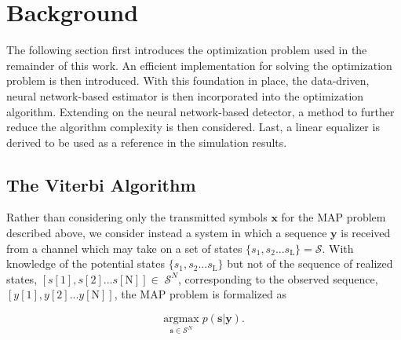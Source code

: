  


 
\section{Background}
The following section first introduces the optimization problem used in the remainder of this work. An efficient implementation for solving the optimization problem is then introduced. With this foundation in place, the data-driven, neural network-based estimator is then incorporated into the optimization algorithm. 
Extending on the neural network-based detector, a method to further reduce the algorithm complexity is then considered. Last, a linear equalizer is derived to be used as a reference in the simulation results. 
\subsection{The Viterbi Algorithm}
Rather than considering only the transmitted symbols $\mathbf{x}$ for the MAP problem described above, we consider instead a system in which a sequence $\mathbf{y}$ is received from a channel which may take on a set of states $\{s_1, s_2... s_{\text{L}}\} = \mathcal{S}$. With knowledge of the potential states $\{s_1, s_2... s_{\text{L}}\}$ but not of the sequence of realized states, $[s[1], s[2]... s[\text{N}]] \in \;\mathcal{S}^N $, corresponding to the observed sequence, $[y[1], y[2]... y[\text{N}]]$, the MAP problem is formalized as

\begin{equation*}
\underset{\mathbf{s}\in\mathcal{S}^N}{\text{argmax}} \; p(\mathbf{s}|\mathbf{y}).
\end{equation*} 

